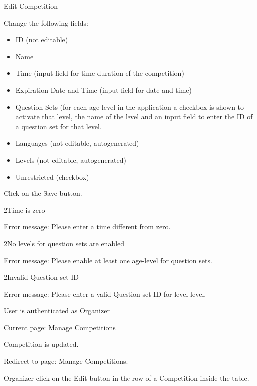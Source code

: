 
\begin{uc}{Edit Competition}

    \begin{uc-mss}
    \item Change the following fields:
    	\begin{itemize}
			\item ID (not editable)
			\item Name
			\item Time (input field for time-duration of the competition)
			\item Expiration Date and Time (input field for date and time)
			\item Question Sets (for each age-level in the application a checkbox is shown
			to activate that level, the name of the level and an input field to enter the
			ID of a question set for that level.
			\item Languages (not editable, autogenerated)
			\item Levels (not editable, autogenerated)
			\item Unrestricted (checkbox)
		\end{itemize}
    \item Click on the Save button.
    \end{uc-mss}

    \begin{uc-ext}

        \begin{uc-fail}{2}{Time is zero}
        \item Error message: Please enter a time different from zero.
        \end{uc-fail}

		\begin{uc-fail}{2}{No levels for question sets are enabled}
        \item Error message: Please enable at least one age-level for question sets.
        \end{uc-fail}
        
        \begin{uc-fail}{2}{Invalid Question-set ID}
        \item Error message: Please enter a valid Question set ID for level {level}.
        \end{uc-fail}

    \end{uc-ext}

    \begin{uc-pre}
    \item User is authenticated as Organizer
    \item Current page: Manage Competitions
    \end{uc-pre}

    \begin{uc-post}
    \item Competition is updated.
    \item Redirect to page: Manage Competitions.
    \end{uc-post}

    \begin{uc-trig}
        Organizer click on the Edit button in the row of a Competition inside the
        table.
    \end{uc-trig}

\end{uc}
